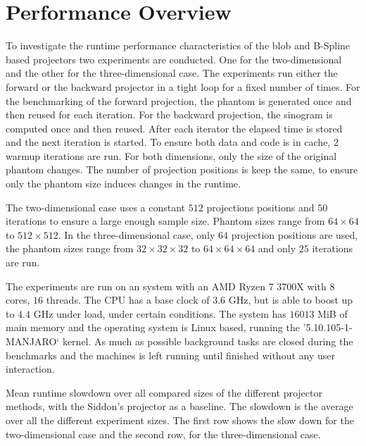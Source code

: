 \section{Performance Overview}\label{sec:experiments_performance_projection}

To investigate the runtime performance characteristics of the blob and B-Spline based projectors two
experiments are conducted. One for the two-dimensional and the other for the three-dimensional case.
The experiments run either the forward or the backward projector in a tight loop for a fixed number
of times. For the benchmarking of the forward projection, the phantom is generated once and then
reused for each iteration. For the backward projection, the sinogram is computed once and then
reused. After each iterator the elapsed time is stored and the next iteration is started. To ensure
both data and code is in cache, 2 warmup iterations are run. For both dimensions, only the size of
the original phantom changes. The number of projection positions is keep the same, to ensure only
the phantom size induces changes in the runtime.

The two-dimensional case uses a constant \(512\) projections positions and \(50\) iterations to
ensure a large enough sample size. Phantom sizes range from \(64 \times 64\) to \(512 \times 512\).
In the three-dimensional case, only \(64\) projection positions are used, the phantom sizes range
from \(32 \times 32 \times 32\) to \(64 \times 64 \times 64\) and only \(25\) iterations are run.

The experiments are run on an system with an AMD Ryzen 7 3700X with \(8\) cores, \(16\) threads. The
CPU has a base clock of \(3.6\) GHz, but is able to boost up to \(4.4\) GHz under load, under
certain conditions. The system has \(16013\) MiB of main memory and the operating system is Linux
based, running the '5.10.105-1-MANJARO` kernel. As much as possible background tasks are closed
during the benchmarks and the machines is left running until finished without any user interaction.

\begin{table}[h]%
	\centering
	\caption{Mean runtime slowdown over all compared sizes of the different projector methods,
		with the Siddon's projector as a baseline. The slowdown is the average over all the
		different experiment sizes. The first row shows the slow down for the
		two-dimensional case and the second row, for the three-dimensional case.}%
	\label{tab:runtime_slowdown}
\end{table}

